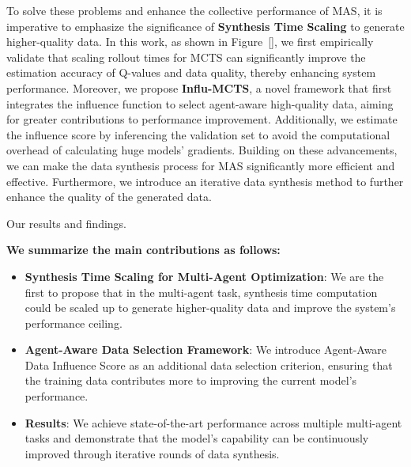 

To solve these problems and enhance the collective performance of MAS, it is imperative to emphasize the significance of \textbf{Synthesis Time Scaling} to generate higher-quality data. In this work, as shown in Figure~\ref{}, we first empirically validate that scaling rollout times for MCTS can significantly improve the estimation accuracy of Q-values and data quality, thereby enhancing system performance. Moreover, we propose \textbf{Influ-MCTS}, a novel framework that first integrates the influence function to select agent-aware high-quality data, aiming for greater contributions to performance improvement. Additionally, we estimate the influence score by inferencing the validation set to avoid the computational overhead of calculating huge models' gradients. Building on these advancements, we can make the data synthesis process for MAS significantly more efficient and effective. Furthermore, we introduce an iterative data synthesis method to further enhance the quality of the generated data.


Our results and findings.


\textbf{We summarize the main contributions as follows:}

\begin{itemize}
    \item \textbf{Synthesis Time Scaling for Multi-Agent Optimization}: We are the first to propose that in the multi-agent task, synthesis time computation could be scaled up to generate higher-quality data and improve the system's performance ceiling.
    \item \textbf{Agent-Aware Data Selection Framework}: We introduce Agent-Aware Data Influence Score as an additional data selection criterion, ensuring that the training data contributes more to improving the current model's performance. 
    \item \textbf{Results}: We achieve state-of-the-art performance across multiple multi-agent tasks and demonstrate that the model's capability can be continuously improved through iterative rounds of data synthesis.
\end{itemize}